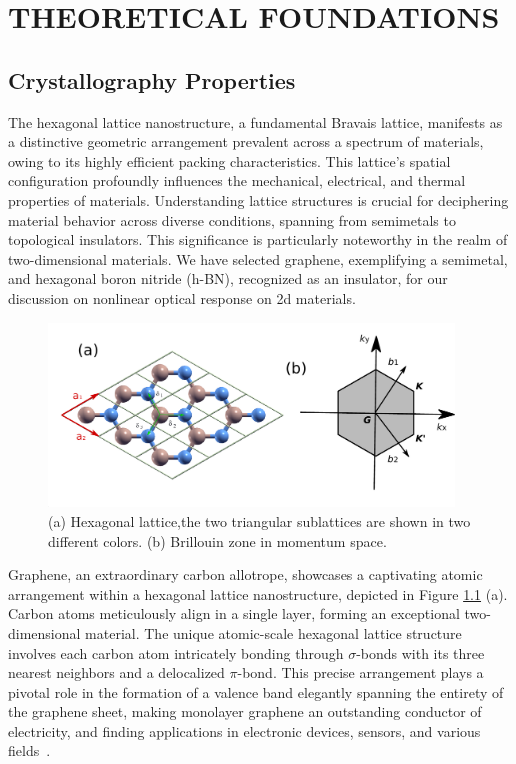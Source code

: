 \chapter{THEORETICAL FOUNDATIONS} 
\label{ch:ch2}
\section{Crystallography Properties}
The hexagonal lattice nanostructure, a fundamental Bravais lattice, manifests as a distinctive geometric arrangement prevalent across a spectrum of materials, owing to its highly efficient packing characteristics. This lattice's spatial configuration profoundly influences the mechanical, electrical, and thermal properties of materials. Understanding lattice structures is crucial for deciphering material behavior across diverse conditions, spanning from semimetals to topological insulators. This significance is particularly noteworthy in the realm of two-dimensional materials. We have selected graphene, exemplifying a semimetal, and hexagonal boron nitride (h-BN), recognized as an insulator, for our discussion on nonlinear optical response on 2d materials.\\
\begin{figure}[htpb]
    \centering
    \includegraphics[width=0.96\textwidth]{pic/lattice.pdf}
    \caption[Lab coordinate system]{(a) Hexagonal lattice,the two triangular sublattices are shown
    in two different colors. (b) Brillouin zone in momentum space.}
    \label{fig: lattice}
\end{figure}
Graphene, an extraordinary carbon allotrope, showcases a captivating atomic arrangement within a
hexagonal lattice nanostructure, depicted in Figure \ref{fig: lattice} (a). Carbon atoms
meticulously align in a single layer, forming an exceptional two-dimensional material. The unique
atomic-scale hexagonal lattice structure involves each carbon atom intricately bonding through
$\sigma$-bonds with its three nearest neighbors and a delocalized $\pi$-bond. This precise
arrangement plays a pivotal role in the formation of a valence band elegantly spanning the entirety
of the graphene sheet, making monolayer graphene an outstanding conductor of electricity, and
finding applications in electronic devices, sensors, and various fields~\cite{sarma2011electronic}.

